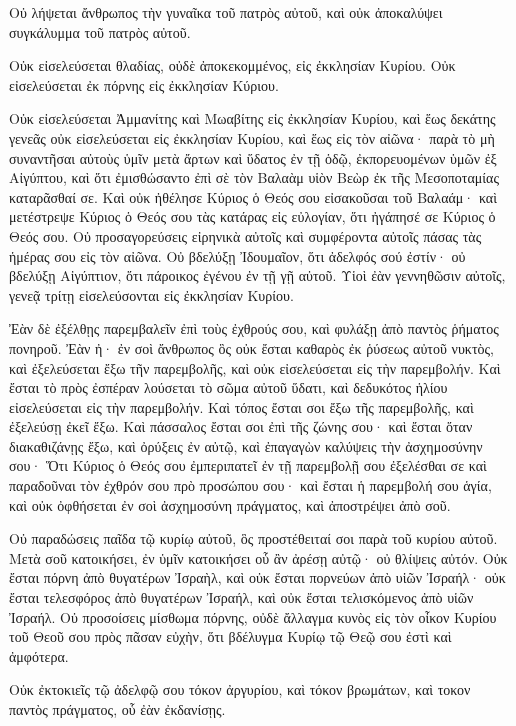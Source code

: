 {Οὐ λήψεται ἄνθρωπος τὴν γυναῖκα τοῦ πατρὸς αὐτοῦ, καὶ οὐκ ἀποκαλύψει συγκάλυμμα τοῦ πατρὸς αὐτοῦ.
\par }{\PP {}Οὐκ εἰσελεύσεται θλαδίας, οὐδὲ ἀποκεκομμένος, εἰς ἐκκλησίαν Κυρίου.
Οὐκ εἰσελεύσεται ἐκ πόρνης εἰς ἐκκλησίαν Κύριου.
\par }{\PP {}Οὐκ εἰσελεύσεται Ἀμμανίτης καὶ Μωαβίτης εἰς ἐκκλησίαν Κυρίου, καὶ ἕως δεκάτης γενεᾶς οὐκ εἰσελεύσεται εἰς ἐκκλησίαν Κυρίου, καὶ ἕως εἰς τὸν αἰῶνα·
παρὰ τὸ μὴ συναντῆσαι αὐτοὺς ὑμῖν μετὰ ἄρτων καὶ ὕδατος ἐν τῇ ὁδῷ, ἐκπορευομένων ὑμῶν ἐξ Αἰγύπτου, καὶ ὅτι ἐμισθώσαντο ἐπὶ σὲ τὸν Βαλαὰμ υἱὸν Βεὼρ ἐκ τῆς Μεσοποταμίας καταρᾶσθαί σε.
Καὶ οὐκ ἠθέλησε Κύριος ὁ Θεός σου εἰσακοῦσαι τοῦ Βαλαάμ· καὶ μετέστρεψε Κύριος ὁ Θεός σου τὰς κατάρας εἰς εὐλογίαν, ὅτι ἠγάπησέ σε Κύριος ὁ Θεός σου.
Οὐ προσαγορεύσεις εἰρηνικὰ αὐτοῖς καὶ συμφέροντα αὐτοῖς πάσας τὰς ἡμέρας σου εἰς τὸν αἰῶνα.
Οὐ βδελύξῃ Ἰδουμαῖον, ὅτι ἀδελφός σού ἐστίν· οὐ βδελύξῃ Αἰγύπτιον, ὅτι πάροικος ἐγένου ἐν τῇ γῇ αὐτοῦ.
Υἱοὶ ἐὰν γεννηθῶσιν αὐτοῖς, γενεᾷ τρίτῃ εἰσελεύσονται εἰς ἐκκλησίαν Κυρίου.
\par }{\PP {}Ἐὰν δὲ ἐξέλθῃς παρεμβαλεῖν ἐπὶ τοὺς ἐχθρούς σου, καὶ φυλάξῃ ἀπὸ παντὸς ῥήματος πονηροῦ.
Ἐὰν ἠ· ἐν σοὶ ἄνθρωπος ὃς οὐκ ἔσται καθαρὸς ἐκ ῥύσεως αὐτοῦ νυκτὸς, καὶ ἐξελεύσεται ἔξω τῆν παρεμβολῆς, καὶ οὐκ εἰσελεύσεται εἰς τὴν παρεμβολήν.
Καὶ ἔσται τὸ πρὸς ἐσπέραν λούσεται τὸ σῶμα αὐτοῦ ὕδατι, καὶ δεδυκότος ἡλίου εἰσελεύσεται εἰς τὴν παρεμβολήν.
Καὶ τόπος ἔσται σοι ἔξω τῆς παρεμβολῆς, καὶ ἐξελεύσῃ ἐκεῖ ἔξω.
Καὶ πάσσαλος ἔσται σοι ἐπὶ τῆς ζώνης σου· καὶ ἔσται ὅταν διακαθιζάνῃς ἔξω, καὶ ὀρύξεις ἐν αὐτῷ, καὶ ἐπαγαγὼν καλύψεις τὴν ἀσχημοσύνην σου·
Ὅτι Κύριος ὁ Θεός σου ἐμπεριπατεῖ ἐν τῇ παρεμβολῇ σου ἐξελέσθαι σε καὶ παραδοῦναι τὸν ἐχθρόν σου πρὸ προσώπου σου· καὶ ἔσται ἡ παρεμβολή σου ἁγία, καὶ οὐκ ὀφθήσεται ἐν σοὶ ἀσχημοσύνη πράγματος, καὶ ἀποστρέψει ἀπὸ σοῦ.
\par }{\PP {}Οὐ παραδώσεις παῖδα τῷ κυρίῳ αὐτοῦ, ὃς προστέθειταί σοι παρὰ τοῦ κυρίου αὐτοῦ.
Μετὰ σοῦ κατοικήσει, ἐν ὑμῖν κατοικήσει οὗ ἂν ἀρέσῃ αὐτῷ· οὐ θλίψεις αὐτόν.
Οὐκ ἔσται πόρνη ἀπὸ θυγατέρων Ἰσραὴλ, καὶ οὐκ ἔσται πορνεύων ἀπὸ υἱῶν Ἰσραήλ· οὐκ ἔσται τελεσφόρος ἀπὸ θυγατέρων Ἰσραήλ, καὶ οὐκ ἔσται τελισκόμενος ἀπὸ υἱῶν Ἰσραήλ.
Οὐ προσοίσεις μίσθωμα πόρνης, οὐδὲ ἄλλαγμα κυνὸς εἰς τὸν οἶκον Κυρίου τοῦ Θεοῦ σου πρὸς πᾶσαν εὐχὴν, ὅτι βδέλυγμα Κυρίῳ τῷ Θεῷ σου ἐστὶ καὶ ἀμφότερα.
\par }{\PP {}Οὐκ ἐκτοκιεῖς τῷ ἀδελφῷ σου τόκον ἀργυρίου, καὶ τόκον βρωμάτων, καὶ τοκον παντὸς πράγματος, οὗ ἐὰν ἐκδανίσῃς.
}
